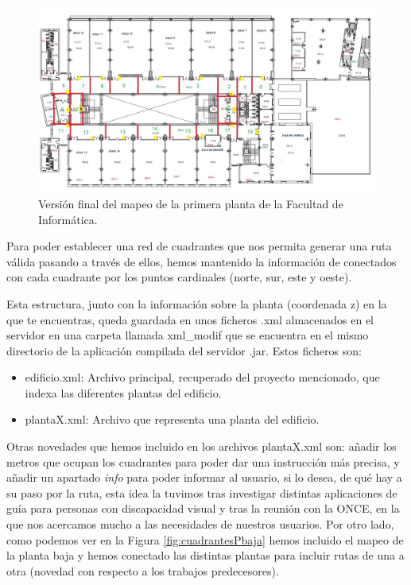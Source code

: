 \begin{figure}[t]
	\centering
	\includegraphics[width=1\textwidth]{Imagenes/Descripciondeltrabajo/mapaplanta1_cuadrantes3}
	\caption{Versión final del mapeo de la primera planta de la Facultad de Informática.}
	\label{fig:cuadrantesP1_v3}
\end{figure}

Para poder establecer una red de cuadrantes que nos permita generar una ruta válida pasando a través de ellos, hemos mantenido la información de conectados con cada cuadrante por los puntos cardinales (norte, sur, este y oeste).

Esta estructura, junto con la información sobre la planta (coordenada z) en la que te encuentras, queda guardada en unos ficheros .xml almacenados en el servidor en una carpeta llamada xml\_modif que se encuentra en el mismo directorio de la aplicación compilada del servidor .jar. Estos ficheros son:

\begin{itemize}
	\item edificio.xml: Archivo principal, recuperado del proyecto mencionado, que indexa las diferentes plantas del edificio.
	\item plantaX.xml: Archivo que representa una planta del edificio.	
\end{itemize}

Otras novedades que hemos incluido en los archivos plantaX.xml son: añadir los metros que ocupan los cuadrantes para poder dar una instrucción más precisa, y añadir un apartado \textit{info} para poder informar al usuario, si lo desea, de qué hay a su paso por la ruta, esta idea la tuvimos tras investigar distintas aplicaciones de guía para personas con discapacidad visual y tras la reunión con la ONCE, en la que nos acercamos mucho a las necesidades de nuestros usuarios. Por otro lado, como podemos ver en la Figura \ref{fig:cuadrantesPbaja} hemos incluido el mapeo de la planta baja y hemos conectado las distintas plantas para incluir rutas de una a otra (novedad con respecto a los trabajos predecesores).

